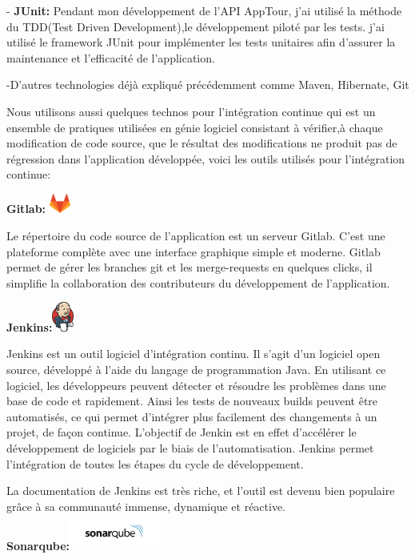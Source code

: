 \documentclass[12pt]{article}
\begin{document}
- \textbf{JUnit:} Pendant mon développement de l'API AppTour, j'ai utilisé la méthode du TDD(Test Driven Development),le développement piloté par les tests. j'ai utilisé le framework JUnit pour implémenter les tests unitaires afin d'assurer la maintenance et l'efficacité de l’application.

-D'autres technologies déjà expliqué précédemment comme Maven, Hibernate, Git

Nous utilisons aussi quelques technos pour l'intégration continue qui est un ensemble de pratiques utilisées en génie logiciel consistant à vérifier,à chaque modification de code source, que le résultat des modifications ne produit pas de régression dans l’application développée, voici les outils utilisés pour l'intégration continue: 

\textbf{Gitlab:} \includegraphics[width=7mm,scale=0.5]{diagrammes/gitlab.png}

Le répertoire du code source de l’application est un serveur Gitlab. C’est une plateforme complète avec une interface graphique simple et moderne. Gitlab permet de gérer les branches git et les merge-requests en quelques clicks, il simplifie la collaboration des contributeurs du développement de l’application. 

\textbf{Jenkins:}\includegraphics[width=7mm,scale=0.5]{diagrammes/jenkins.png}

Jenkins est un outil logiciel d’intégration continu. Il s’agit d’un logiciel open source, développé à l’aide du langage de programmation Java. En utilisant ce logiciel, les développeurs peuvent détecter et résoudre les problèmes dans une base de code et rapidement. Ainsi les tests de nouveaux builds peuvent être automatisés, ce qui permet d’intégrer plus facilement des changements à un projet, de façon continue. L’objectif de Jenkin est en effet d’accélérer le développement de logiciels par le biais de l’automatisation. Jenkins permet l’intégration de toutes les étapes du cycle de développement.


La documentation de Jenkins est très riche, et l’outil est devenu bien populaire grâce à sa communauté immense, dynamique et réactive.\\
\newpage
\textbf{Sonarqube:}\includegraphics[width=30mm,scale=0.5]{diagrammes/sonarqube.png}
\end{document}
